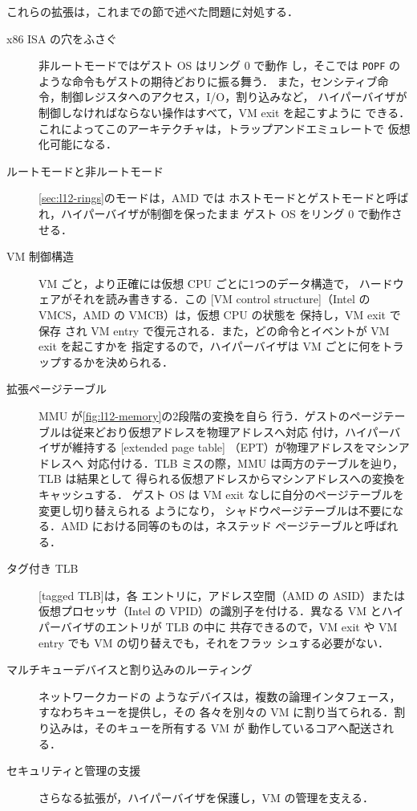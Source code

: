 \documentclass[../main.tex]{subfiles}
\begin{document}
これらの拡張は，これまでの節で述べた問題に対処する．
\begin{description}
  \item[x86 ISA の穴をふさぐ] 非ルートモードではゲスト OS はリング 0 で動作
    し，そこでは \texttt{POPF} のような命令もゲストの期待どおりに振る舞う．
    また，センシティブ命令，制御レジスタへのアクセス，I/O，割り込みなど，
    ハイパーバイザが制御しなければならない操作はすべて，VM exit を起こすように
    できる．これによってこのアーキテクチャは，トラップアンドエミュレートで
    仮想化可能になる．
  \item[ルートモードと非ルートモード] \cref{sec:l12-rings}のモードは，AMD では
    ホストモードとゲストモードと呼ばれ，ハイパーバイザが制御を保ったまま
    ゲスト OS をリング 0 で動作させる．
  \item[VM 制御構造] VM ごと，より正確には仮想 CPU ごとに1つのデータ構造で，
    ハードウェアがそれを読み書きする．この
    [VM control structure]（Intel の
    VMCS，AMD の VMCB）は，仮想 CPU の状態を
    保持し，VM exit で保存
    され VM entry で復元される．また，どの命令とイベントが VM exit を起こすかを
    指定するので，ハイパーバイザは VM ごとに何をトラップするかを決められる．
  \item[拡張ページテーブル] MMU が\cref{fig:l12-memory}の2段階の変換を自ら
    行う．ゲストのページテーブルは従来どおり仮想アドレスを物理アドレスへ対応
    付け，ハイパーバイザが維持する
    [extended page table]%
    （EPT）が物理アドレスをマシンアドレスへ
    対応付ける．TLB ミスの際，MMU は両方のテーブルを辿り，TLB は結果として
    得られる仮想アドレスからマシンアドレスへの変換をキャッシュする．
    ゲスト OS は VM exit なしに自分のページテーブルを変更し切り替えられる
    ようになり，
    シャドウページテーブルは不要になる．AMD における同等のものは，ネステッド
    ページテーブルと呼ばれる．
  \item[タグ付き TLB] [tagged TLB]は，各
    エントリに，アドレス空間（AMD の ASID）または仮想プロセッサ（Intel の
    VPID）の識別子を付ける．異なる VM とハイパーバイザのエントリが TLB の中に
    共存できるので，VM exit や VM entry でも VM の切り替えでも，それをフラッ
    シュする必要がない．
  \item[マルチキューデバイスと割り込みのルーティング] ネットワークカードの
    ようなデバイスは，複数の論理インタフェース，すなわちキューを提供し，その
    各々を別々の VM に割り当てられる．割り込みは，そのキューを所有する VM が
    動作しているコアへ配送される．
  \item[セキュリティと管理の支援] さらなる拡張が，ハイパーバイザを保護し，VM
    の管理を支える．
\end{description}
\end{document}
